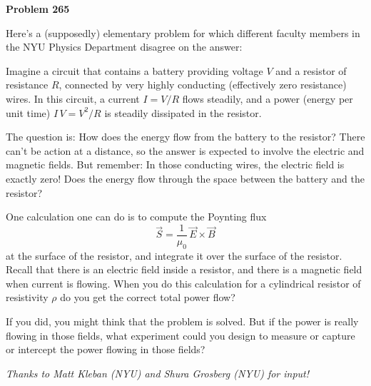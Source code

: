 \documentclass[12pt]{article}
\begin{document}
\begin{pottproblem}
\textbf{Problem 265}

Here's a (supposedly) elementary problem for which different faculty
members in the NYU Physics Department disagree on the answer:

Imagine a circuit that contains a battery providing voltage $V$ and a
resistor of resistance $R$, connected by very highly conducting
(effectively zero resistance) wires.  In this circuit, a current
$I=V/R$ flows steadily, and a power (energy per unit time)
$I\,V=V^2/R$ is steadily dissipated in the resistor.

The question is: How does the energy flow from the battery to the
resistor? There can't be action at a distance, so the answer is
expected to involve the electric and magnetic fields. But remember: In
those conducting wires, the electric field is exactly zero! Does the
energy flow through the space between the battery and the resistor?

One calculation one can do is to compute the Poynting flux
$$
\vec{S} = \frac{1}{\mu_0}\,\vec{E}\times\vec{B}
$$
at the surface of the resistor, and integrate it over the surface of
the resistor.  Recall that there is an electric field inside a
resistor, and there is a magnetic field when current is flowing.  When
you do this calculation for a cylindrical resistor of resistivity
$\rho$ do you get the correct total power flow?

If you did, you might think that the problem is solved. But if the
power is really flowing in those fields, what experiment could you
design to measure or capture or intercept the power flowing in those
fields?

{\normalsize\emph{Thanks to Matt Kleban (NYU) and Shura Grosberg (NYU) for input!}}
\end{pottproblem}
\end{document}
